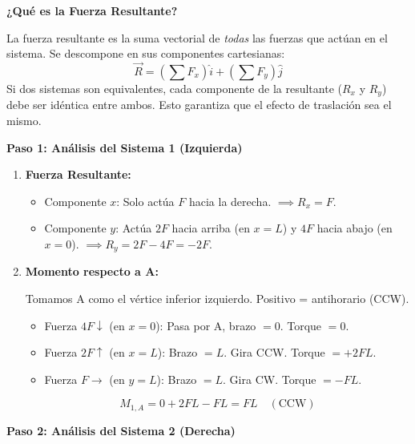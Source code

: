 \documentclass{article}
\begin{document}
\vspace{0.3cm}
\textbf{¿Qué es la Fuerza Resultante?}

La fuerza resultante es la suma vectorial de \textit{todas} las fuerzas que actúan en el sistema. Se descompone en sus componentes cartesianas:
$$ \vec{R} = \left(\sum F_x\right)\hat{i} + \left(\sum F_y\right)\hat{j} $$
Si dos sistemas son equivalentes, cada componente de la resultante ($R_x$ y $R_y$) debe ser idéntica entre ambos. Esto garantiza que el efecto de traslación sea el mismo.

\vspace{0.3cm}
\textbf{Paso 1: Análisis del Sistema 1 (Izquierda)}

\begin{enumerate}
    \item \textbf{Fuerza Resultante:}
    \begin{itemize}
        \item Componente $x$: Solo actúa $F$ hacia la derecha. $\implies R_x = F$.
        \item Componente $y$: Actúa $2F$ hacia arriba (en $x=L$) y $4F$ hacia abajo (en $x=0$). $\implies R_y = 2F - 4F = -2F$.
    \end{itemize}

    \item \textbf{Momento respecto a A:}

    Tomamos A como el vértice inferior izquierdo. Positivo = antihorario (CCW).
    \begin{itemize}
        \item Fuerza $4F\downarrow$ (en $x=0$): Pasa por A, brazo $= 0$. Torque $= 0$.
        \item Fuerza $2F\uparrow$ (en $x=L$): Brazo $= L$. Gira CCW. Torque $= +2FL$.
        \item Fuerza $F\rightarrow$ (en $y=L$): Brazo $= L$. Gira CW. Torque $= -FL$.
    \end{itemize}
    $$ M_{1,A} = 0 + 2FL - FL = FL \quad (\text{CCW}) $$
\end{enumerate}

\vspace{0.3cm}
\textbf{Paso 2: Análisis del Sistema 2 (Derecha)}
\end{document}
